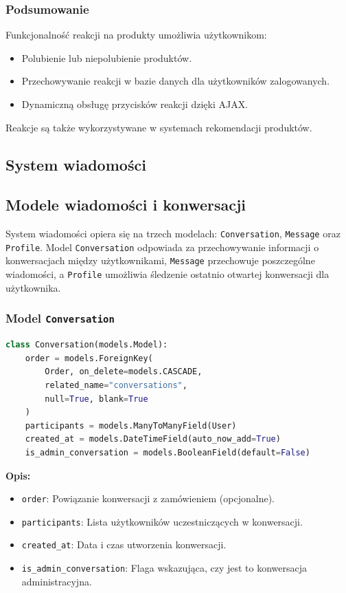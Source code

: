 \documentclass[12pt,a4paper,oneside]{article}
\theoremstyle{definition}
\numberwithin{equation}{section}
\begin{document}
\subsubsection{Podsumowanie}
Funkcjonalność reakcji na produkty umożliwia użytkownikom:
\begin{itemize}
    \item Polubienie lub niepolubienie produktów.
    \item Przechowywanie reakcji w bazie danych dla użytkowników zalogowanych.
    \item Dynamiczną obsługę przycisków reakcji dzięki AJAX.
\end{itemize}
Reakcje są także wykorzystywane w systemach rekomendacji produktów.

% 
% 
\clearpage
\subsection*{System wiadomości}
\subsection{Modele wiadomości i konwersacji}
System wiadomości opiera się na trzech modelach: \texttt{Conversation}, \texttt{Message} oraz \texttt{Profile}. Model \texttt{Conversation} odpowiada za przechowywanie informacji o konwersacjach między użytkownikami, \texttt{Message} przechowuje poszczególne wiadomości, a \texttt{Profile} umożliwia śledzenie ostatnio otwartej konwersacji dla użytkownika.

\subsubsection*{Model \texttt{Conversation}}
\begin{lstlisting}[language=Python, caption=Model \texttt{Conversation}]
class Conversation(models.Model):
    order = models.ForeignKey(
        Order, on_delete=models.CASCADE,
        related_name="conversations",
        null=True, blank=True
    )
    participants = models.ManyToManyField(User)
    created_at = models.DateTimeField(auto_now_add=True)
    is_admin_conversation = models.BooleanField(default=False)
\end{lstlisting}
\textbf{Opis:}
\begin{itemize}
    \item \texttt{order}: Powiązanie konwersacji z zamówieniem (opcjonalne).
    \item \texttt{participants}: Lista użytkowników uczestniczących w konwersacji.
    \item \texttt{created\_at}: Data i czas utworzenia konwersacji.
    \item \texttt{is\_admin\_conversation}: Flaga wskazująca, czy jest to konwersacja administracyjna.
\end{itemize}
\end{document}
